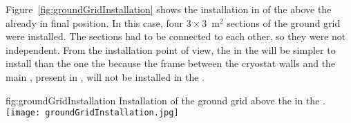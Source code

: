 Figure~\ref{fig:groundGridInstallation} shows the installation in  of the   above the  already in final position.
In this case, four $3 \times 3$~m$^2$ sections of the ground grid were installed.
The sections had to be connected to each other, so they were not independent.
From the installation point of view, the  in the  will be simpler to install than the one the   because the  frame between the cryostat walls and the main , present in , will not be installed in the .

\begin{dunefigure}{fig:groundGridInstallation}
{Installation of the ground grid above the  in the .}
\texttt{[image: groundGridInstallation.jpg]}
\end{dunefigure}

